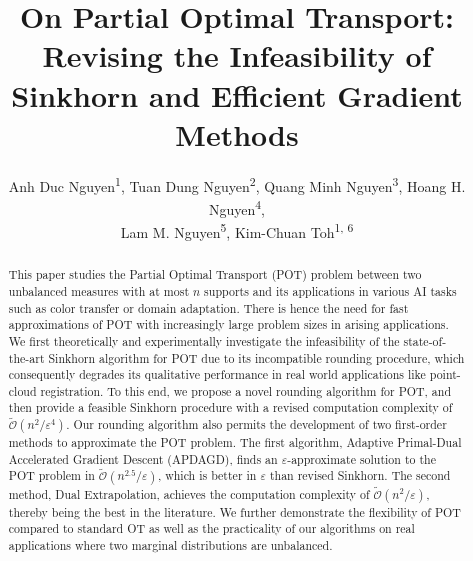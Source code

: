 \documentclass[letterpaper]{article} %
\title{On Partial Optimal Transport: Revising the Infeasibility of Sinkhorn and Efficient Gradient Methods}
\author{
    Anh Duc Nguyen\textsuperscript{\rm 1},
    Tuan Dung Nguyen\textsuperscript{\rm 2},
     Quang Minh Nguyen\textsuperscript{\rm 3},
    Hoang H. Nguyen\textsuperscript{\rm 4}, \\
    Lam M. Nguyen\textsuperscript{\rm 5},
    Kim-Chuan Toh\textsuperscript{\rm 1, 6}
}
\theoremstyle{plain}
\theoremstyle{definition}
\theoremstyle{remark}
\begin{document}
\maketitle
\begin{abstract}
This paper studies the Partial Optimal Transport (POT) problem between two unbalanced measures with at most $n$ supports and its applications in various AI tasks such as color transfer or domain adaptation. There is hence the need for fast approximations of POT with increasingly large problem sizes in arising applications. We first theoretically and experimentally investigate the infeasibility of the state-of-the-art Sinkhorn algorithm for POT due to its incompatible rounding procedure, which consequently degrades its qualitative performance in real world applications like point-cloud registration. To this end, we propose a novel rounding algorithm for POT, and then provide a feasible Sinkhorn procedure with a revised computation complexity of $\mathcal{\widetilde O}(n^2/\varepsilon^4)$. Our rounding algorithm also permits the development of two first-order methods to approximate the POT problem. The first algorithm, Adaptive Primal-Dual Accelerated Gradient Descent (APDAGD), finds an $\varepsilon$-approximate solution to the POT problem in $\mathcal{\widetilde O}(n^{2.5}/\varepsilon)$, which is better in $\varepsilon$ than revised Sinkhorn. The second method, Dual Extrapolation, achieves the computation complexity of $\mathcal{\widetilde O}(n^2/\varepsilon)$, thereby being the best in the literature. We further demonstrate the flexibility of POT compared to standard OT as well as the practicality of our algorithms on real applications where two marginal distributions are unbalanced.
\end{abstract}










\clearpage

\onecolumn



\end{document}
